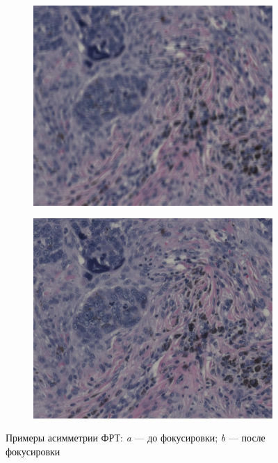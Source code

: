\begin{figure}[!htbp]
	\begin{subfigure}[t]{0.45\linewidth}
		\centering
		\includegraphics[width=1.0\linewidth]{my_folder/images/defocus6800.jpg}
		\caption{}
		\label{fig:defocus-2700}
	\end{subfigure}
	\hfill
	\begin{subfigure}[t]{0.45\linewidth}
		\centering
		\includegraphics[width=1.0\linewidth]{my_folder/images/defocus-200.jpg}
		\caption{}
		\label{fig:defocus-200}
	\end{subfigure}
	\caption{Примеры асимметрии ФРТ: {\itshape a} --- до фокусировки; {\itshape b} --- после фокусировки}
	\label{fig:Result_example}
\end{figure}

